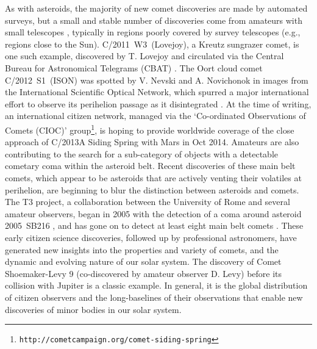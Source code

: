 \documentclass{ar2e}
\def\url#1{\texttt{#1}}
\begin{document}
As with asteroids, the majority of new comet discoveries are made by automated
surveys, but a small and stable number of discoveries come from amateurs with
small telescopes \citep{14mousis_proam}, typically in regions poorly covered
by survey telescopes (e.g., regions close to the Sun).   C/2011~W3~(Lovejoy),
a Kreutz sungrazer comet, is one such example, discovered by T. Lovejoy and
circulated via the Central Bureau for Astronomical Telegrams (CBAT)
\citep[e.g.,][]{12sekanina}.  The Oort cloud comet C/2012~S1~(ISON) was
spotted by V. Nevski and A. Novichonok in images from the International
Scientific Optical Network, which spurred a major international effort to
observe its perihelion passage as it disintegrated \citep{14sekanina}.   At
the time of writing, an international citizen network, managed via the
`Co-ordinated  Observations of Comets (CIOC)' 
group\footnote{\url{http://cometcampaign.org/comet-siding-spring}},  is hoping
to provide worldwide coverage of the close approach of C/2013A Siding  Spring
with Mars in Oct 2014.  Amateurs are also contributing to the search for a
sub-category of objects with a detectable cometary coma within the asteroid
belt.  Recent discoveries of these main belt comets, which appear to be
asteroids that are actively venting their volatiles at perihelion, are
beginning to blur the distinction between asteroids and comets.  The T3
project, a collaboration between the University of Rome and several amateur
observers, began in 2005 with the detection of a coma around asteroid
2005~SB216 \citep{06buzzi}, and has gone on to detect at least eight main belt
comets \citep{14mousis_proam}.  These early citizen science discoveries,
followed up by professional astronomers, have generated new insights into the
properties and variety of comets, and the dynamic and evolving nature of our
solar system.  The discovery of Comet Shoemaker-Levy 9 (co-discovered by
amateur observer D. Levy) before its collision with Jupiter
\citep{04harrington} is a classic example. In general, it is the global
distribution of citizen observers and the long-baselines of their observations
that enable new discoveries of minor bodies in our solar system.


\end{document}
